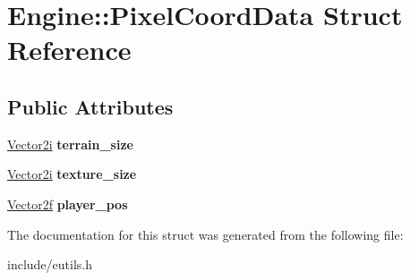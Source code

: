 \hypertarget{structEngine_1_1PixelCoordData}{}\section{Engine\+:\+:Pixel\+Coord\+Data Struct Reference}
\label{structEngine_1_1PixelCoordData}
\subsection*{Public Attributes}
\begin{DoxyCompactItemize}
\item 
\hypertarget{structEngine_1_1PixelCoordData_a9cbdb8651e5e3e35f6ca1d18d90fc03e}{}\hyperlink{classVector2}{Vector2i} {\bfseries terrain\+\_\+size}\label{structEngine_1_1PixelCoordData_a9cbdb8651e5e3e35f6ca1d18d90fc03e}

\item 
\hypertarget{structEngine_1_1PixelCoordData_a72bdec3875808ed3e086272c687a3a4a}{}\hyperlink{classVector2}{Vector2i} {\bfseries texture\+\_\+size}\label{structEngine_1_1PixelCoordData_a72bdec3875808ed3e086272c687a3a4a}

\item 
\hypertarget{structEngine_1_1PixelCoordData_abc0179853658fda0f0f0e65d2f856c33}{}\hyperlink{classVector2}{Vector2f} {\bfseries player\+\_\+pos}\label{structEngine_1_1PixelCoordData_abc0179853658fda0f0f0e65d2f856c33}

\end{DoxyCompactItemize}


The documentation for this struct was generated from the following file\+:\begin{DoxyCompactItemize}
\item 
include/eutils.\+h\end{DoxyCompactItemize}
